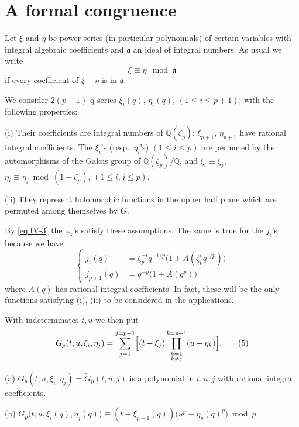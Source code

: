 \section{A formal congruence}\label{sec:IV-formal}

Let $\xi$ and $\eta$ be power series (in particular polynomials) of
certain variables with integral algebraic coefficients and $\mathfrak{a}$
an ideal of integral numbers. As usual we write
\[
\xi\equiv\eta\mod\mathfrak{a}
\]
if every coefficient of $\xi-\eta$ is in $\mathfrak{a}$.

We consider $2(p+1)$ q-series $\xi_{i}(q)$, $\eta_{i}(q)$,
$(1\leq i\leq p+1)$, with the following properties:

(i) Their coefficients are integral numbers of $\mathbb{Q}(\zeta_{p})$;
$\xi_{p+1}$, $\eta_{p+1}$ have rational integral coefficients. The
$\xi_{i}$'s (resp.\ $\eta_{i}$'s) $(1\leq i\leq p)$ are permuted by the
automorphisms of the Galois group of $\mathbb{Q}(\zeta_{p})/\mathbb{Q}$,
and $\xi_{i}\equiv\xi_{j}$, $\eta_{i}\equiv\eta_{j}\bmod(1-\zeta_{p})$,
$(1\leq i,j\leq p)$.

(ii) They represent holomorphic functions in the upper half plane which
are permuted among themselves by $G$.

By \eqref{eq:IV-3} the $\varphi_{i}$'s satisfy these assumptions. The
same is true for the $j_{i}$'s because we have
\[
\left\{
\begin{aligned}
j_{i}(q)&=\zeta_{p}^{-i}q^{-1/p}\bigl(1+A(\zeta_{p}^{i}q^{1/p})\bigr)\\
j_{p+1}(q)&=q^{-p}\bigl(1+A(q^{p})\bigr)
\end{aligned}\right.
\tag{4}\label{eq:IV-4}
\]
where $A(q)$ has rational integral coefficients. In fact, these will be
the only functions satisfying (i), (ii) to be considered in the
applications.

With indeterminates $t,u$ we then put
\[
G_{p}(t,u,\xi_{i},\eta_{j})
=\sum_{j=1}^{j=p+1}\Bigl[(t-\xi_{j})
\prod_{\substack{k=1\\ k\neq j}}^{k=p+1}(u-\eta_{k})\Bigr].
\tag{5}\label{eq:IV-5}
\]

\begin{lemma}\label{lem:IV-4}
(a) $G_{p}(t,u,\xi_{i},\eta_{j})=\widetilde{G}_{p}(t,u,j)$ is a
polynomial in $t,u,j$ with rational integral coefficients.

(b) $G_{p}\bigl(t,u,\xi_{i}(q),\eta_{j}(q)\bigr)
\equiv(t-\xi_{p+1}(q))\bigl(u^{p}-\eta_{p}(q)^{p}\bigr)\bmod p$.
\end{lemma}

